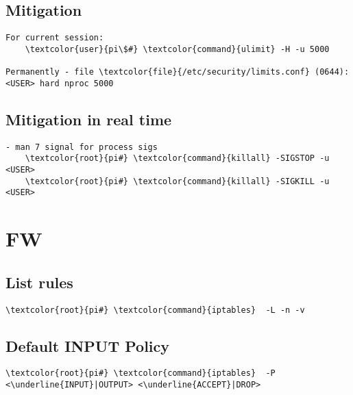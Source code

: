\documentclass[10pt, a4paper, onecolumn, openany]{book} %
\begin{document}
\subsection{Mitigation}
\begin{Verbatim}[commandchars=\\\{\}]
For current session:
    \textcolor{user}{pi\$#} \textcolor{command}{ulimit} -H -u 5000

Permanently - file \textcolor{file}{/etc/security/limits.conf} (0644):
<USER> hard nproc 5000
\end{Verbatim}
\subsection{Mitigation in real time}
\begin{Verbatim}[commandchars=\\\{\}]
- man 7 signal for process sigs
    \textcolor{root}{pi#} \textcolor{command}{killall} -SIGSTOP -u <USER>
    \textcolor{root}{pi#} \textcolor{command}{killall} -SIGKILL -u <USER>
\end{Verbatim}

\section{FW}
\subsection{List rules}
\begin{Verbatim}[commandchars=\\\{\}]
    \textcolor{root}{pi#} \textcolor{command}{iptables}  -L -n -v
\end{Verbatim}

\subsection{Default INPUT Policy}
\begin{Verbatim}[commandchars=\\\{\}]
    \textcolor{root}{pi#} \textcolor{command}{iptables}  -P <\underline{INPUT}|OUTPUT> <\underline{ACCEPT}|DROP>
\end{Verbatim}
\end{document}
